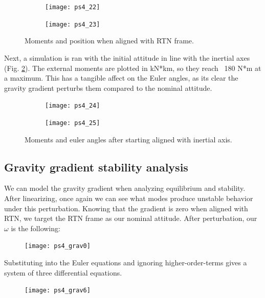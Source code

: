 \documentclass[12pt, letterpaper]{article}
\begin{document}
\begin{figure}[H]
	\centering
	\begin{subfigure}[b]{0.49\textwidth}
		\texttt{[image: ps4\_22]}
	\end{subfigure}
	\begin{subfigure}[b]{0.49\textwidth}
		\texttt{[image: ps4\_23]}
	\end{subfigure}
	\caption{Moments and position when aligned with RTN frame.}
	\label{(4:mom1)}
\end{figure}

Next, a simulation is ran with the initial attitude in line with the inertial axes (Fig. \ref{(4:mom2)}). The external moments are plotted in kN*km, so they reach ~180 N*m at a maximum. This has a tangible affect on the Euler angles, as its clear the gravity gradient perturbs them compared to the nominal attitude.

\begin{figure}[H]
	\centering
	\begin{subfigure}[b]{0.49\textwidth}
		\texttt{[image: ps4\_24]}
	\end{subfigure}
	\begin{subfigure}[b]{0.49\textwidth}
		\texttt{[image: ps4\_25]}
	\end{subfigure}
	\caption{Moments and euler angles after starting aligned with inertial axis.}
	\label{(4:mom2)}
\end{figure}

\subsection{Gravity gradient stability analysis}

We can model the gravity gradient when analyzing equilibrium and stability. After linearizing, once again we can see what modes produce unstable behavior under this perturbation. Knowing that the gradient is zero when aligned with RTN, we target the RTN frame as our nominal attitude. After perturbation, our $\omega$ is the following:

\begin{figure}[H]
	\centering
	\texttt{[image: ps4\_grav0]}
\end{figure}

Substituting into the Euler equations and ignoring higher-order-terms gives a system of three differential equations.

\begin{figure}[H]
	\centering
	\texttt{[image: ps4\_grav6]}
\end{figure}
\end{document}
